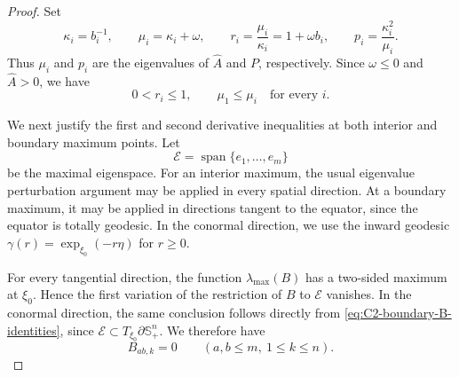 \documentclass[11pt, reqno]{amsart}
\theoremstyle{remark}
\theoremstyle{definition}
\numberwithin{equation}{section}
\begin{document}
\begin{proof}
Set
\begin{equation*}
        \kappa_i=b_i^{-1},
        \qquad
        \mu_i=\kappa_i+\omega,
        \qquad
        r_i=\frac{\mu_i}{\kappa_i}=1+\omega b_i,
        \qquad
        p_i=\frac{\kappa_i^2}{\mu_i}.
\end{equation*}
Thus $\mu_i$ and $p_i$ are the eigenvalues of $\widehat A$ and
$P$, respectively. Since $\omega\leq0$ and $\widehat A>0$, we
have
\begin{equation*}
        0<r_i\leq1,
        \qquad
        \mu_1\leq\mu_i
        \quad\text{for every }i.
\end{equation*}

We next justify the first and second derivative inequalities at
both interior and boundary maximum points. Let
\begin{equation*}
        \mathcal E
        =
        \operatorname{span}\{e_1,\ldots,e_m\}
\end{equation*}
be the maximal eigenspace. For an interior maximum, the usual
eigenvalue perturbation argument may be applied in every spatial
direction. At a boundary maximum, it may be applied in directions
tangent to the equator, since the equator is totally geodesic. In
the conormal direction, we use the inward geodesic
$\gamma(r)=\exp_{\xi_0}(-r\eta)$ for $r\geq0$.

For every tangential direction, the function
$\lambda_{\max}(B)$ has a two-sided maximum at $\xi_0$. Hence the
first variation of the restriction of $B$ to $\mathcal E$
vanishes. In the conormal direction, the same conclusion follows
directly from
\eqref{eq:C2-boundary-B-identities}, since
$\mathcal E\subset T_{\xi_0}\partial\mathbb S^n_+$. We therefore
have
\begin{equation}\label{eq:C2-top-block-first-derivative}
        B_{ab,k}=0
        \qquad
        (a,b\leq m,\ 1\leq k\leq n).
\end{equation}


\end{proof}
\end{document}
